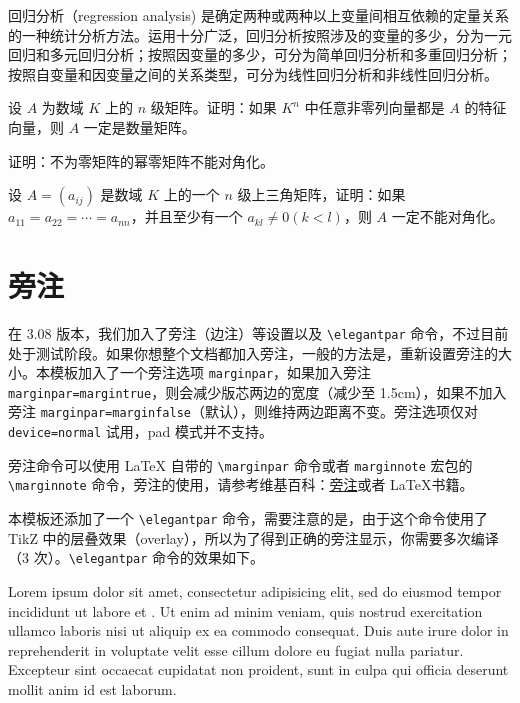 	\begin{conclusion}
	回归分析（regression analysis) 是确定两种或两种以上变量间相互依赖的定量关系的一种统计分析方法。运用十分广泛，回归分析按照涉及的变量的多少，分为一元回归和多元回归分析；按照因变量的多少，可分为简单回归分析和多重回归分析；按照自变量和因变量之间的关系类型，可分为线性回归分析和非线性回归分析。
	\end{conclusion}
	
	\begin{problemset}
	\item 设 $A$ 为数域 $K$ 上的 $n$ 级矩阵。证明：如果 $K^n$ 中任意非零列向量都是 $A$ 的特征向量，则 $A$ 一定是数量矩阵。
	\item 证明：不为零矩阵的幂零矩阵不能对角化。
	\item 设 $A = (a_{ij})$ 是数域 $K$ 上的一个 $n$ 级上三角矩阵，证明：如果 $a_{11} = a_{22} = \cdots = a_{nn}$，并且至少有一个 $a_{kl} \not = 0 (k < l)$，则 $A$ 一定不能对角化。
	\end{problemset}
	
	\chapter{旁注}
	在 3.08 版本，我们加入了旁注（边注）等设置以及 \lstinline{\elegantpar} 命令，不过目前处于测试阶段。如果你想整个文档都加入旁注，一般的方法是，重新设置旁注的大小。本模板加入了一个旁注选项 \lstinline{marginpar}，如果加入旁注 \lstinline{marginpar=margintrue}，则会减少版芯两边的宽度（减少至 1.5cm），如果不加入旁注 \lstinline{marginpar=marginfalse}（默认），则维持两边距离不变。旁注选项仅对 \lstinline{device=normal} 试用，pad 模式并不支持。
	
	旁注命令可以使用 \LaTeX{} 自带的 \lstinline{\marginpar} 命令或者 \lstinline{marginnote}  宏包的  \lstinline{\marginnote}  命令，旁注的使用，请参考维基百科：\href{https://en.wikibooks.org/wiki/LaTeX/Footnotes_and_Margin_Notes#Margin_Notes}{旁注}或者 \LaTeX {}书籍。
	
	本模板还添加了一个 \lstinline{\elegantpar} 命令，需要注意的是，由于这个命令使用了 TikZ 中的层叠效果（overlay），所以为了得到正确的旁注显示，你需要多次编译（3 次）。\lstinline{\elegantpar} 命令的效果如下。
	
	Lorem ipsum dolor sit amet, consectetur adipisicing elit, sed do eiusmod
	tempor incididunt ut labore et . Ut enim ad minim veniam,
	quis nostrud exercitation ullamco laboris nisi ut aliquip ex ea commodo
	consequat. Duis aute irure dolor in reprehenderit in voluptate velit esse
	cillum dolore eu fugiat nulla pariatur. Excepteur sint occaecat cupidatat non
	proident, sunt in culpa qui officia deserunt mollit anim id est laborum.
	
